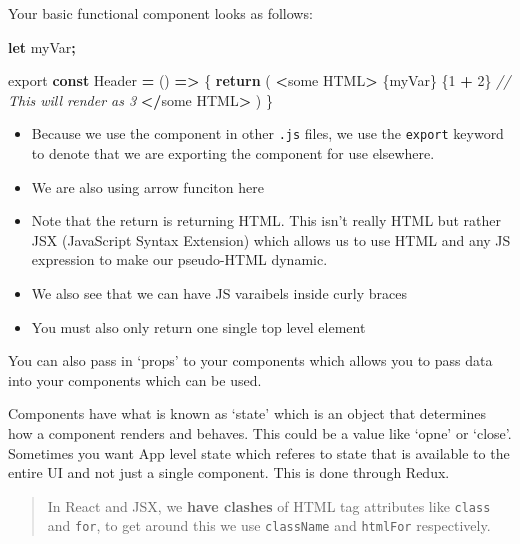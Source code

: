 \documentclass[
]{report}
\newenvironment{Shaded}{\begin{snugshade}}{\end{snugshade}}
\newcommand{\CommentTok}[1]{\textcolor[rgb]{0.56,0.35,0.01}{\textit{#1}}}
\newcommand{\ControlFlowTok}[1]{\textcolor[rgb]{0.13,0.29,0.53}{\textbf{#1}}}
\newcommand{\DecValTok}[1]{\textcolor[rgb]{0.00,0.00,0.81}{#1}}
\newcommand{\ImportTok}[1]{#1}
\newcommand{\KeywordTok}[1]{\textcolor[rgb]{0.13,0.29,0.53}{\textbf{#1}}}
\newcommand{\NormalTok}[1]{#1}
\newcommand{\OperatorTok}[1]{\textcolor[rgb]{0.81,0.36,0.00}{\textbf{#1}}}
\providecommand{\tightlist}{%
  \setlength{\itemsep}{0pt}\setlength{\parskip}{0pt}}
\begin{document}
Your basic functional component looks as follows:

\begin{Shaded}
\begin{Highlighting}[]
\KeywordTok{let}\NormalTok{ myVar}\OperatorTok{;}

\ImportTok{export} \KeywordTok{const}\NormalTok{ Header }\OperatorTok{=}\NormalTok{ () }\KeywordTok{=\textgreater{}}\NormalTok{ \{}
    \ControlFlowTok{return}\NormalTok{ (}
        \OperatorTok{\textless{}}\NormalTok{some HTML}\OperatorTok{\textgreater{}}
\NormalTok{            \{myVar\}}
\NormalTok{            \{}\DecValTok{1} \OperatorTok{+} \DecValTok{2}\NormalTok{\} }\CommentTok{// This will render as 3}
        \OperatorTok{\textless{}/}\NormalTok{some HTML}\OperatorTok{\textgreater{}}
\NormalTok{    )}
\NormalTok{\}}
\end{Highlighting}
\end{Shaded}

\begin{itemize}
\tightlist
\item
  Because we use the component in other \texttt{.js} files, we use the \texttt{export} keyword to denote that we are exporting the component for use elsewhere.
\item
  We are also using arrow funciton here
\item
  Note that the return is returning HTML. This isn't really HTML but rather JSX (JavaScript Syntax Extension) which allows us to use HTML and any JS expression to make our pseudo-HTML dynamic.
\item
  We also see that we can have JS varaibels inside curly braces
\item
  You must also only return one single top level element
\end{itemize}

You can also pass in `props' to your components which allows you to pass data into your components which can be used.

Components have what is known as `state' which is an object that determines how a component renders and behaves. This could be a value like `opne' or `close'. Sometimes you want App level state which referes to state that is available to the entire UI and not just a single component. This is done through Redux.

\begin{quote}
In React and JSX, we \textbf{have clashes} of HTML tag attributes like \texttt{class} and \texttt{for}, to get around this we use \texttt{className} and \texttt{htmlFor} respectively.
\end{quote}
\end{document}
